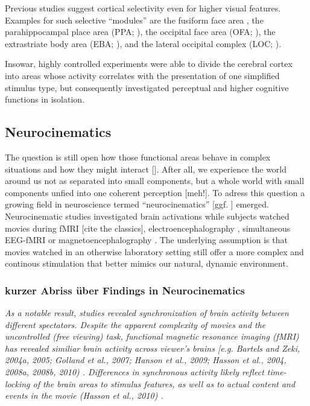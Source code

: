 \documentclass[10pt,a4paper,twocolumn]{article}
\begin{document}
Previous studies suggest cortical selectivity even for higher visual
features. Examples for such selective ``modules'' are the fusiform
face area \citep[FFA;][]{kanwisher_1997_fusiform_face_area}, the
parahippocampal place area (PPA; \citep{epstein_1999_parahippocampal_place_area}),
the occipital face area (OFA; \citep{pitcher_2011_occipital_face_area}),
the extrastriate body area (EBA; \citep{downing_2001_extrastriate_body_area}),
and the lateral occipital complex (LOC; \citep{malach_1995_lateral_occipital_complex}).

Insowar, highly controlled experiments were able to divide the cerebral
cortex into areas whose activity correlates with the presentation
of one simplified stimulus type, but consequently investigated perceptual
and higher cognitive functions in isolation. 


\subsection*{Neurocinematics}

The question is still open how those functional areas behave in complex
situations and how they might interact {[}\citep{bartels_2004_mapping_during_free_viewing}{]}.
After all, we experience the world around us not as separated into
small components, but a whole world with small components unfied into
one coherent perception {[}meh!{]}. To adress this question a growing
field in neuroscience termed ``neurocinematics'' \citep{hasson_2008_neurocinematics}
{[}ggf. \citep{hasson_2012_future_trends_neuroimaging}{]} emerged.
Neurocinematic studies investigated brain activations while subjects
watched movies during fMRI {[}cite the classics{]}, electroencephalography
\citep{dmochowski_2014_walking_dead_tweets,krause_2000_eeg_to_emotional_film},
simultaneous EEG-fMRI \citep{whittingstall_2010_movies_eeg_fmri}
or magnetoencephalography \citep{huttunen_2013_mind_reading_logistic_regression,lankinen_2014_MEG_during_movie,luo_2010_auditory_cortex_tracks}.
The underlying assumption is that movies watched in an otherwise laboratory
setting still offer a more complex and continous stimulation that
better mimics our natural, dynamic environment.


\subsubsection*{kurzer Abriss über Findings in Neurocinematics}

\emph{As a notable result, studies revealed synchronization of brain
	activity between different spectators. Despite the apparent complexity
	of movies and the uncontrolled (free viewing) task, functional magnetic
	resonance imaging (fMRI) has revealed similiar brain activity across
	viewer's brains {[}e.g. Bartels and Zeki, 2004a, 2005; Golland et
	al., 2007; Hanson et al., 2009; Hasson et al., 2004, 2008a, 2008b,
	2010) \citep{hasson_2004_synchronization_natural_vision,hasson_2006_human_brain_during_dynamic_scenes,hasson_2008_hierarchy_temporal_windows}.
	Differences in synchronous activity likely reflect time-locking of
	the brain areas to stimulus features, as well as to actual content
	and events in the movie (Hasson et al., 2010) \citep{lankinen_2014_MEG_during_movie}. }
\end{document}
